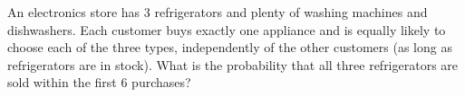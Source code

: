 An electronics store has $3$ refrigerators and plenty of washing machines and dishwashers. Each customer buys exactly one appliance and is equally likely to choose each of the three types, independently of the other customers (as long as refrigerators are in stock). What is the probability that all three refrigerators are sold within the first $6$ purchases?
